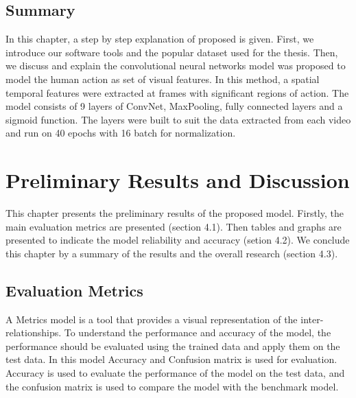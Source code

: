 \section{Summary}
\hspace{5mm} In this chapter, a step by step explanation of proposed is given. First, we introduce our software tools and the popular dataset used for the thesis. Then, we discuss and explain the convolutional neural networks model was proposed to model the human action as set of visual features. In this method, a spatial temporal features were extracted at frames with significant regions of action. The model consists of 9 layers of ConvNet, MaxPooling, fully connected layers and a sigmoid function. The layers were built to suit the data extracted from each video and run on 40 epochs with 16 batch for normalization.
\chapter{Preliminary Results and Discussion}
This chapter presents the preliminary results of the proposed model. Firstly, the main evaluation metrics are presented (section 4.1). Then tables and graphs are presented to indicate the model reliability and accuracy (setion 4.2). We conclude this chapter by a summary of the results and the overall research (section 4.3).

\section{Evaluation Metrics}
\hspace{5mm} A Metrics model is a tool that provides a visual representation of the inter-relationships. To understand the performance and accuracy of the model, the performance should be evaluated using the trained data and apply them on the test data. In this model Accuracy and Confusion matrix is used for evaluation. Accuracy is used to evaluate the performance of the model on the test data, and the confusion matrix is used to compare the model with the benchmark model.
